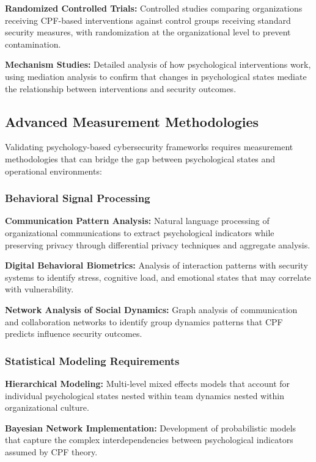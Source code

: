 \documentclass[11pt,a4paper]{article}
\begin{document}
\textbf{Randomized Controlled Trials:} Controlled studies comparing organizations receiving CPF-based interventions against control groups receiving standard security measures, with randomization at the organizational level to prevent contamination.

\textbf{Mechanism Studies:} Detailed analysis of how psychological interventions work, using mediation analysis to confirm that changes in psychological states mediate the relationship between interventions and security outcomes.

\subsection{Advanced Measurement Methodologies}

Validating psychology-based cybersecurity frameworks requires measurement methodologies that can bridge the gap between psychological states and operational environments:

\subsubsection{Behavioral Signal Processing}

\textbf{Communication Pattern Analysis:} Natural language processing of organizational communications to extract psychological indicators while preserving privacy through differential privacy techniques and aggregate analysis.

\textbf{Digital Behavioral Biometrics:} Analysis of interaction patterns with security systems to identify stress, cognitive load, and emotional states that may correlate with vulnerability.

\textbf{Network Analysis of Social Dynamics:} Graph analysis of communication and collaboration networks to identify group dynamics patterns that CPF predicts influence security outcomes.

\subsubsection{Statistical Modeling Requirements}

\textbf{Hierarchical Modeling:} Multi-level mixed effects models that account for individual psychological states nested within team dynamics nested within organizational culture.

\textbf{Bayesian Network Implementation:} Development of probabilistic models that capture the complex interdependencies between psychological indicators assumed by CPF theory.
\end{document}
